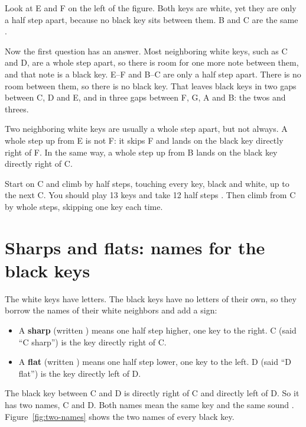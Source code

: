 Look at E and F on the left of the figure. Both keys are white, yet they are only a half step apart, because no black key sits between them. B and C are the same .

Now the first question has an answer. Most neighboring white keys, such as C and D, are a whole step apart, so there is room for one more note between them, and that note is a black key. E--F and B--C are only a half step apart. There is no room between them, so there is no black key. That leaves black keys in two gaps between C, D and E, and in three gaps between F, G, A and B: the twos and threes.

\begin{trapbox}
Two neighboring white keys are usually a whole step apart, but not always. A whole step up from E is not F: it skips F and lands on the black key directly right of F. In the same way, a whole step up from B lands on the black key directly right of C.
\end{trapbox}

\begin{tryitbox}
Start on C and climb by half steps, touching every key, black and white, up to the next C. You should play 13 keys and take 12 half steps . Then climb from C by whole steps, skipping one key each time.
\end{tryitbox}

\section{Sharps and flats: names for the black keys}

The white keys have letters. The black keys have no letters of their own, so they borrow the names of their white neighbors and add a sign:
\begin{itemize}
  \item A \textbf{sharp} (written \sh) means one half step higher, one key to the right. C\sh{} (said ``C sharp'') is the key directly right of C.
  \item A \textbf{flat} (written \fl) means one half step lower, one key to the left. D\fl{} (said ``D flat'') is the key directly left of D.
\end{itemize}

The black key between C and D is directly right of C and directly left of D. So it has two names, C\sh{} and D\fl. Both names mean the same key and the same sound . Figure~\ref{fig:two-names} shows the two names of every black key.

